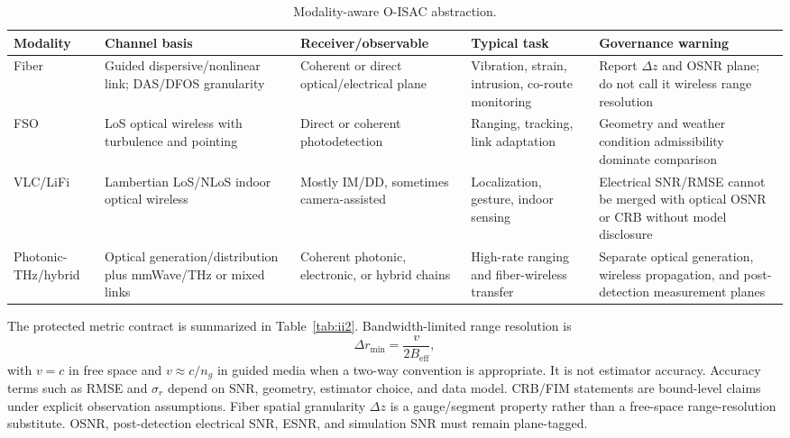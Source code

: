 \documentclass[letterpaper,journal]{IEEEtran}
\begin{document}
\begin{table}[!t]
    \caption{Modality-aware O-ISAC abstraction.}
    \label{tab:ii1}
    \centering
    \scriptsize
    \setlength{\tabcolsep}{2.7pt}
    \renewcommand{\arraystretch}{1.08}
    \begin{tabularx}{\textwidth}{@{}p{1.65cm}p{2.05cm}p{2.15cm}p{2.0cm}X@{}}
        \toprule
        Modality & Channel basis & Receiver/observable & Typical task & Governance warning \\
        \midrule
        Fiber & Guided dispersive/nonlinear link; DAS/DFOS granularity & Coherent or direct optical/electrical plane & Vibration, strain, intrusion, co-route monitoring & Report $\Delta z$ and OSNR plane; do not call it wireless range resolution \\
        FSO & LoS optical wireless with turbulence and pointing & Direct or coherent photodetection & Ranging, tracking, link adaptation & Geometry and weather condition admissibility dominate comparison \\
        VLC/LiFi & Lambertian LoS/NLoS indoor optical wireless & Mostly IM/DD, sometimes camera-assisted & Localization, gesture, indoor sensing & Electrical SNR/RMSE cannot be merged with optical OSNR or CRB without model disclosure \\
        Photonic-THz/hybrid & Optical generation/distribution plus mmWave/THz or mixed links & Coherent photonic, electronic, or hybrid chains & High-rate ranging and fiber-wireless transfer & Separate optical generation, wireless propagation, and post-detection measurement planes \\
        \bottomrule
    \end{tabularx}
\end{table}

The protected metric contract is summarized in Table~\ref{tab:ii2}. Bandwidth-limited range resolution is
\begin{equation}
    \Delta r_{\min}=\frac{v}{2B_{\mathrm{eff}}},
    \label{eq:range_resolution}
\end{equation}
with $v=c$ in free space and $v\approx c/n_g$ in guided media when a two-way convention is appropriate. It is not estimator accuracy. Accuracy terms such as RMSE and $\sigma_r$ depend on SNR, geometry, estimator choice, and data model. CRB/FIM statements are bound-level claims under explicit observation assumptions. Fiber spatial granularity $\Delta z$ is a gauge/segment property rather than a free-space range-resolution substitute. OSNR, post-detection electrical SNR, ESNR, and simulation SNR must remain plane-tagged.
\end{document}
